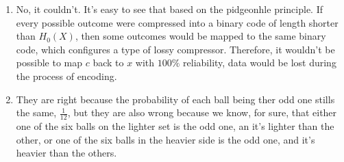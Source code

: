\documentclass{article}
\begin{document}
\begin{enumerate}
	\item No, it couldn't. It's easy to see that based on the pidgeonhle principle. If every possible outcome were compressed into a binary code of length shorter than \(H_0(X)\), then some outcomes would be mapped to the same binary code, which configures a type of lossy compressor. Therefore, it wouldn't be possible to map \(c\) back to \(x\) with \(100\%\) reliability, data would be lost during the process of encoding.

	\item They are right because the probability of each ball being ther odd one stills the same, \(\frac{1}{12}\), but they are also wrong because we know, for sure, that either one of the six balls on the lighter set is the odd one, an it's lighter than the other, or one of the six balls in the heavier side is the odd one, and it's heavier than the others.

\end{enumerate}


\end{document}
